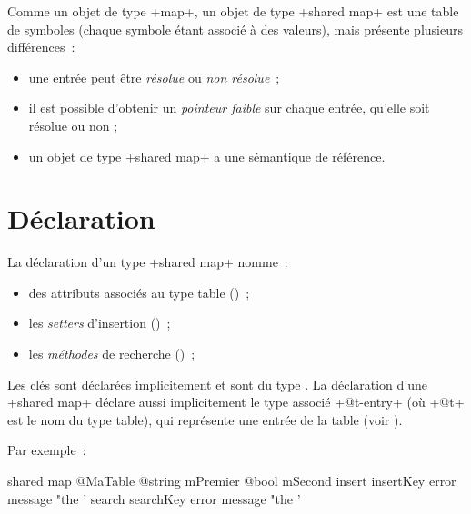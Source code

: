 

\tableDesMatieresDuChapitre


Comme un objet de type  \ggs+map+, un objet de type \ggs+shared map+ est une table de symboles (chaque symbole étant associé à des valeurs), mais présente plusieurs différences~:
\begin{itemize}
  \item une entrée peut être \emph{résolue} ou \emph{non résolue}~;
  \item il est possible d'obtenir un \emph{pointeur faible} sur chaque entrée, qu'elle soit résolue ou non ;
  \item un objet de type \ggs+shared map+ a une sémantique de référence.
\end{itemize}



\section{Déclaration}

La déclaration d'un type \ggs+shared map+ nomme~:
\begin{itemize}
  \item des attributs associés au type table ()~;
  \item les \emph{setters} d'insertion ()~;
  \item les \emph{méthodes} de recherche ()~;
\end{itemize}

Les clés sont déclarées implicitement et sont du type . La déclaration d'une \ggs+shared map+ déclare aussi implicitement le type associé \ggs+@t-entry+ (où \ggs+@t+ est le nom du type table), qui représente une entrée de la table (voir ).

Par exemple~:

\begin{galgas}
shared map @MaTable {
  @string mPremier
  @bool mSecond
  insert insertKey error message "the '%
  search searchKey error message "the '%
}
\end{galgas}

